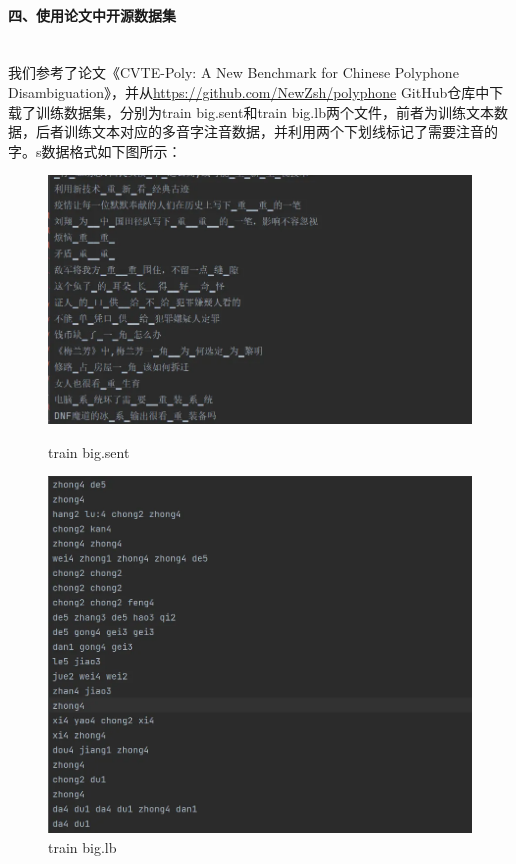 \documentclass[12pt,hyperref,a4paper,UTF8]{ctexart}
\begin{document}
\paragraph{四、使用论文中开源数据集}\leavevmode\\
\indent 我们参考了论文《CVTE-Poly: A New Benchmark for Chinese Polyphone Disambiguation》，并从\url{https://github.com/NewZsh/polyphone} GitHub仓库中下载了训练数据集，分别为train big.sent和train big.lb两个文件，前者为训练文本数据，后者训练文本对应的多音字注音数据，并利用两个下划线标记了需要注音的字。s数据格式如下图所示：
\begin{figure}[htbp]
    \centering
    \begin{minipage}[b]{0.45\textwidth}
        \centering
        \includegraphics[width=\textwidth]{figures/image3.png} %
        \caption{train big.sent}
        \label{fig:image3}
    \end{minipage}
    \hspace{0.05\textwidth} %
    \begin{minipage}[b]{0.45\textwidth}
        \centering
        \includegraphics[width=\textwidth]{figures/image4.png} %
        \caption{train big.lb }
        \label{fig:image4}
    \end{minipage}
\end{figure}
\end{document}
